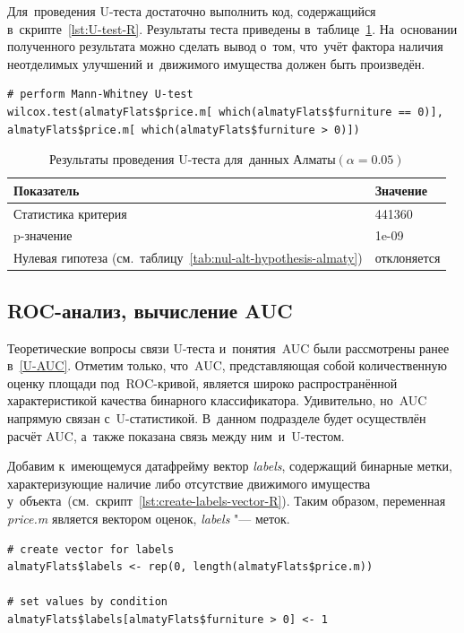 \documentclass[]{scrreprt}
\begin{document}
Для~проведения U-теста достаточно выполнить код, содержащийся в~скрипте~\ref{lst:U-test-R}. Результаты теста приведены в~таблице~\ref{tab:u-test-r-result}. На~основании полученного результата можно сделать вывод о~том, что~учёт фактора наличия неотделимых улучшений и~движимого имущества должен быть произведён.
%
\begin{lstlisting}[float, caption = Проведение U-теста для данных города Алматы, firstnumber=1, label= lst:U-test-R]
# perform Mann-Whitney U-test
wilcox.test(almatyFlats$price.m[ which(almatyFlats$furniture == 0)],
almatyFlats$price.m[ which(almatyFlats$furniture > 0)]) 
\end{lstlisting}
%
\begin{table}[ht]
	\caption{Результаты проведения U-теста для~данных Алматы$({\textstyle \alpha=0.05})$}\label{tab:u-test-r-result}
	\centering
	\begin{tabular}{ll}
		\hline
		Показатель&Значение\\
		\hline
		Статистика критерия&441360\\
		\hline
		p-значение&1e-09\\
		\hline
		Нулевая гипотеза (см.~таблицу~\ref{tab:nul-alt-hypothesis-almaty})&отклоняется\\
		\hline
	\end{tabular}
\end{table}
%
\subsection{ROC-анализ, вычисление AUC}
Теоретические вопросы связи U-теста и~понятия~AUC были рассмотрены ранее в~\ref{U-AUC}. Отметим только, что~AUC, представляющая собой количественную оценку площади под~ROC-кривой, является широко распространённой характеристикой качества бинарного классификатора. Удивительно, но~AUC напрямую связан с~U-статистикой. В~данном подразделе будет осуществлён расчёт AUC, а~также показана связь между ним~и~U-тестом.

Добавим к~имеющемуся датафрейму вектор \textit{labels}, содержащий бинарные метки, характеризующие наличие либо отсутствие движимого имущества у~объекта~(см.~скрипт~\ref{lst:create-labels-vector-R}). Таким образом, переменная \textit{price.m} является вектором оценок, \textit{labels} "--- меток.
%
\begin{lstlisting}[float, caption = Добавление переменной с~бинарными метками, firstnumber=1, label= lst:create-labels-vector-R]
# create vector for labels
almatyFlats$labels <- rep(0, length(almatyFlats$price.m))

# set values by condition
almatyFlats$labels[almatyFlats$furniture > 0] <- 1
\end{lstlisting}
%
\end{document}

